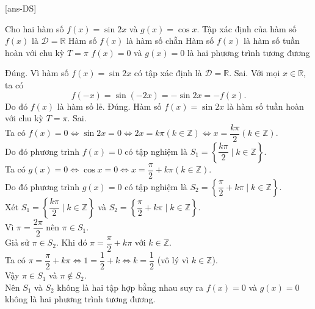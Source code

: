 [ans-DS]
\begin{ex}%
Cho hai hàm số $f(x)=\sin 2x$ và $g(x)=\cos x$.
\choiceTF
{\True Tập xác định của hàm số $f(x)$ là $\mathscr{D}=\mathbb{R}$}
{Hàm số $f(x)$ là hàm số chẵn}
{\True Hàm số $f(x)$ là hàm số tuần hoàn với chu kỳ $T=\pi$}
{$f(x)=0$ và $g(x)=0$ là hai phương trình tương đương}
\loigiai
{
\begin{itemchoice}
\itemch Đúng. Vì hàm số $f(x)=\sin 2x$ có tập xác định là $\mathscr{D}=\mathbb{R}$.
\itemch Sai. Với mọi $x \in \mathbb{R}$, ta có
$$f(-x)=\sin(-2x)=-\sin2x=-f(x).$$
Do đó $f(x)$ là hàm số lẻ.
\itemch Đúng. Hàm số $f(x)=\sin 2x$ là hàm số tuần hoàn với chu kỳ $T=\pi$.
\itemch Sai. \\
Ta có $f(x)=0 \Leftrightarrow \sin 2x=0 \Leftrightarrow 2x = k \pi (k \in \mathbb{Z}) \Leftrightarrow x =\dfrac{k \pi}{2}(k \in \mathbb{Z})$.\\
Do đó phương trình $f(x)=0$ có tập nghiệm là $S_1=\left\{\dfrac{k \pi}{2} \mid k \in \mathbb{Z}\right\}$.\\
Ta có $g(x)=0 \Leftrightarrow \cos x =0 \Leftrightarrow x =\dfrac{\pi}{2} + k \pi (k \in \mathbb{Z})$.\\
Do đó phương trình $g(x)=0$ có tập nghiệm là $S_2=\left\{\dfrac{\pi}{2}+k \pi \mid k \in \mathbb{Z}\right\}$.\\
Xét $S_1=\left\{\dfrac{k \pi}{2} \mid k \in \mathbb{Z}\right\}$ và $S_2=\left\{\dfrac{\pi}{2}+k \pi \mid k \in \mathbb{Z}\right\}$.\\
Vì $\pi=\dfrac{2\pi}{2}$ nên $\pi \in S_1$.\\
Giả sử $\pi \in S_2$. Khi đó $\pi=\dfrac{\pi}{2}+k \pi$ với $k \in \mathbb{Z}$.\\
Ta có $\pi=\dfrac{\pi}{2}+k \pi \Leftrightarrow 1=\dfrac{1}{2}+k \Leftrightarrow k =\dfrac{1}{2}$ (vô lý vì $k \in \mathbb{Z}$).\\
Vậy $\pi \in S_1$ và $\pi \notin S_2$.\\
Nên $S_1$ và $S_2$ không là hai tập hợp bằng nhau suy ra $f(x)=0$ và $g(x)=0$ không là hai phương trình tương đương.
\end{itemchoice}
}
\end{ex}

